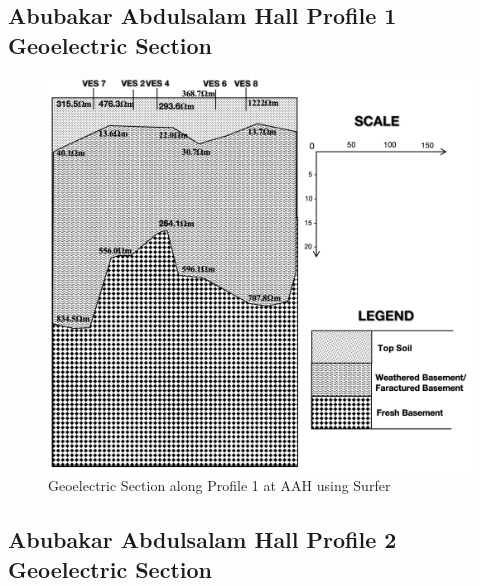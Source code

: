 \documentclass[12pt,a4paper]{report}
\begin{document}
\subsection{Abubakar Abdulsalam Hall Profile 1 Geoelectric Section}
\begin{figure}[H]
    \centering
    \includegraphics[width=1.0\textwidth]{AAH_PROFILE_1.png}
    \caption{Geoelectric Section along Profile 1 at AAH using Surfer}
    \label{fig:AAH_Surfer_Profile_1}
\end{figure}

\subsection{Abubakar Abdulsalam Hall Profile 2 Geoelectric Section}
\end{document}

